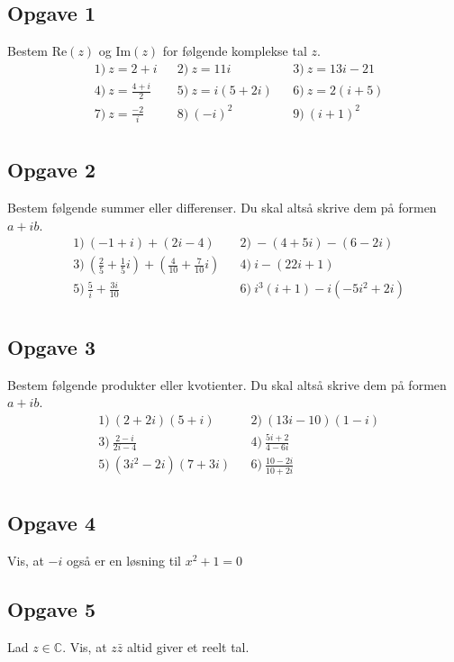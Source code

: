 \subsection*{Opgave 1}
Bestem Re$(z)$ og Im$(z)$ for følgende komplekse tal $z$. 
\begin{align*}
	&1) \ z = 2 + i   &&2) \ z = 11i   &&3) \ z = 13i - 21   \\
	&4) \ z = \frac{4+i}{2}   &&5) \ z = i(5+2i)    &&6) \ z = 2(i+5)   \\
	&7) \ z = \frac{-2}{i}   &&8) \  (-i)^2  &&9) \  (i+1)^2   \\
\end{align*} 

\subsection*{Opgave 2}
Bestem følgende summer eller differenser. Du skal altså skrive dem på formen $a + ib$. 
\begin{align*}
	&1) \  (-1 + i) + (2i - 4)    &&2) \ -(4+5i)-(6-2i)    \\
	&3) \  \left(\frac{2}{5} + \frac{1}{5}i\right) + \left(\frac{4}{10} + \frac{7}{10}i\right)    &&4) \  i -(22i + 1)  \\
	&5) \ \frac{5}{i} + \frac{3i}{10}   & &6) \ i^3(i+1) - i(-5i^2 + 2i)   \\
\end{align*}

\subsection*{Opgave 3}
Bestem følgende produkter eller kvotienter. Du skal altså skrive dem på formen $a + ib$. 
\begin{align*}
	&1) \   (2+2i)(5+i)   &&2) \ (13i - 10)(1-i)     \\
	&3) \   \frac{2-i}{2i-4}   &&4) \  \frac{5i + 2}{4 - 6i}    \\
	&5) \   (3i^2-2i)(7+3i)   &&6) \  \frac{10 - 2i}{10 + 2i}     \\
\end{align*}

\subsection*{Opgave 4}
Vis, at $-i$ også er en løsning til $x^2 + 1 = 0$

\subsection*{Opgave 5}
Lad $z\in \mathbb{C}$. Vis, at $z\bar{z}$ altid giver et reelt tal.

